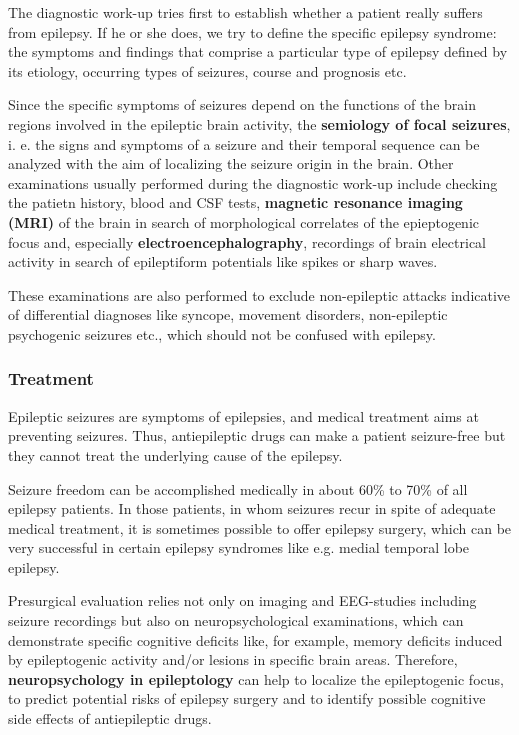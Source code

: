 \documentclass[12pt,article,oneside,a4paper]{memoir}
\begin{document}
The diagnostic work-up tries first to establish whether a patient really
suffers from epilepsy. If he or she does, we try to define the specific
epilepsy syndrome: the symptoms and findings that comprise a particular type of
epilepsy defined by its etiology, occurring types of seizures, course and
prognosis etc.

Since the specific symptoms of seizures depend on the functions of the brain
regions involved in the epileptic brain activity, the \textbf{semiology of
focal seizures}, i. e. the signs and symptoms of a seizure and their temporal
sequence can be analyzed with the aim of localizing the seizure origin in the
brain.
Other examinations usually performed during the diagnostic work-up include
checking the patietn history, blood and CSF tests, \textbf{magnetic resonance
imaging (MRI)} of the brain in search of morphological correlates of the
epieptogenic focus and, especially \textbf{electroencephalography}, recordings
of brain electrical activity in search of epileptiform potentials like spikes
or sharp waves.

These examinations are also performed to exclude non-epileptic attacks
indicative of differential diagnoses like syncope, movement disorders,
non-epileptic psychogenic seizures etc., which should not be confused with
epilepsy.

\subsubsection{Treatment}

Epileptic seizures are symptoms of epilepsies, and medical treatment aims at
preventing seizures. Thus, antiepileptic drugs can make a patient seizure-free
but they cannot treat the underlying cause of the epilepsy.

Seizure freedom can be accomplished medically in about 60\% to 70\% of all
epilepsy patients. In those patients, in whom seizures recur in spite of
adequate medical treatment, it is sometimes possible to offer epilepsy surgery,
which can be very successful in certain epilepsy syndromes like e.g. medial
temporal lobe epilepsy.

Presurgical evaluation relies not only on imaging and EEG-studies including
seizure recordings but also on neuropsychological examinations, which can
demonstrate specific cognitive deficits like, for example, memory deficits
induced by epileptogenic activity and/or lesions in specific brain areas.
Therefore, \textbf{neuropsychology in epileptology} can help to localize the
epileptogenic focus, to predict potential risks of epilepsy surgery and to
identify possible cognitive side effects of antiepileptic drugs.
\end{document}

